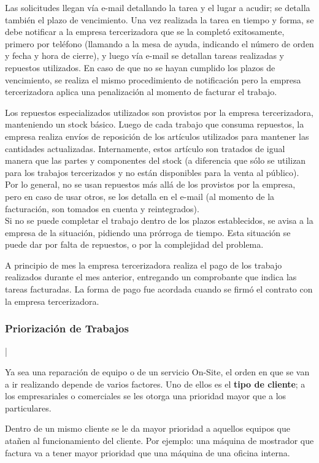\documentclass[12pt]{extarticle}
\begin{document}
\begin{spacing}{1.2}
    Las solicitudes llegan vía e-mail detallando la tarea y el lugar a acudir; se detalla también el plazo de vencimiento.
    Una vez realizada la tarea en tiempo y forma, se debe notificar a la empresa tercerizadora que se la completó exitosamente, primero por teléfono (llamando a la mesa de ayuda, indicando el número de orden y fecha y hora de cierre), y luego vía e-mail se detallan tareas realizadas y repuestos utilizados.
    En caso de que no se hayan cumplido los plazos de vencimiento, se realiza el mismo procedimiento de notificación pero la empresa tercerizadora aplica una penalización al momento de facturar el trabajo.

    Los repuestos especializados utilizados son provistos por la empresa tercerizadora, manteniendo un stock básico. Luego de cada trabajo que consuma repuestos, la empresa realiza envíos de reposición de los artículos utilizados para mantener las cantidades actualizadas. 
    Internamente, estos artículo son tratados de igual manera que las partes y componentes del stock (a diferencia que sólo se utilizan para los trabajos tercerizados y no están disponibles para la venta al público).
    Por lo general, no se usan repuestos más allá de los provistos por la empresa, pero en caso de usar otros, se los detalla en el e-mail (al momento de la facturación, son tomados en cuenta y reintegrados).\\

    Si no se puede completar el trabajo dentro de los plazos establecidos, se avisa a la empresa de la situación, pidiendo una prórroga de tiempo. Esta situación se puede dar por falta de repuestos, o por la complejidad del problema.

    A principio de mes la empresa tercerizadora realiza el pago de los trabajo realizados durante el mes anterior, entregando un comprobante que indica las tareas facturadas. La forma de pago fue acordada cuando se firmó el contrato con la empresa tercerizadora.

    \subsubsection*{Priorización de Trabajos}|

    Ya sea una reparación de equipo o de un servicio On-Site, el orden en que se van a ir realizando depende de varios factores. Uno de ellos es el \textbf{tipo de cliente}; a los empresariales o comerciales se les otorga una prioridad mayor que a los particulares.

    Dentro de un mismo cliente se le da mayor prioridad a aquellos equipos que atañen al funcionamiento del cliente. Por ejemplo: una máquina de mostrador que factura va a tener mayor prioridad que una máquina de una oficina interna.


\end{spacing}
\end{document}
